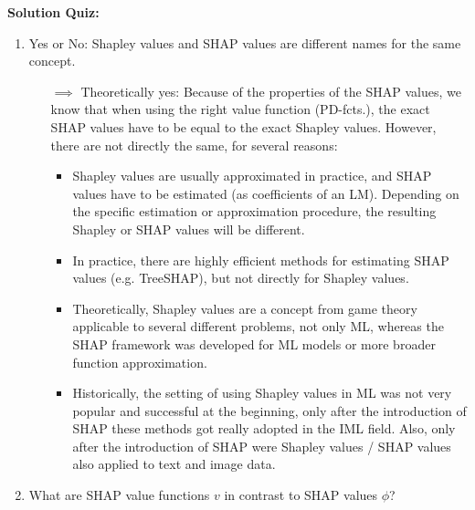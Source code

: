 \textbf{Solution Quiz:}\\\noindent
\medskip

\begin{enumerate}
    \item Yes or No: Shapley values and SHAP values are different names for the same concept.
    \begin{itemize}
    	\item[$\implies$] Theoretically yes: Because of the properties of the SHAP values, we know that when using the right value function (PD-fcts.), the exact SHAP values have to be equal to the exact Shapley values.
        However, there are not directly the same, for several reasons:
        \begin{itemize}
            \item Shapley values are usually approximated in practice, and SHAP values have to be estimated (as coefficients of an LM).
            Depending on the specific estimation or approximation procedure, the resulting Shapley or SHAP values will be different.
            \item In practice, there are highly efficient methods for estimating SHAP values (e.g. TreeSHAP), but not directly for Shapley values.
            \item Theoretically, Shapley values are a concept from game theory applicable to several different problems, not only ML, whereas the SHAP framework was developed for ML models or more broader function approximation.
            \item
            Historically, the setting of using Shapley values in ML was not very popular and successful at the beginning, only after the introduction of SHAP these methods got really adopted in the IML field.
            Also, only after the introduction of SHAP were Shapley values / SHAP values also applied to text and image data.
        \end{itemize}
    \end{itemize}
    \item What are SHAP value functions $v$ in contrast to SHAP values $\phi$?
    \begin{itemize}

\end{itemize}
\end{enumerate}
